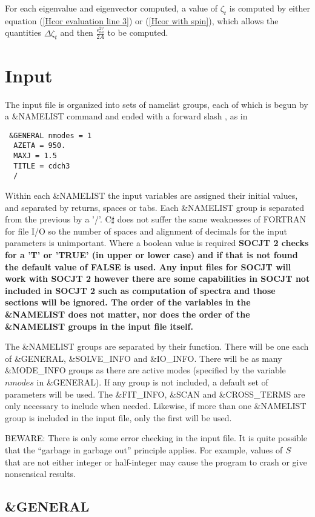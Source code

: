 \documentclass{article}
\newcommand{\socjttwo}{\bf{SOCJT 2 }}
\newcommand{\socjt}{{\bf SOCJT }}
\begin{document}
For each eigenvalue and eigenvector computed, a value of $\zeta _t$ is
computed by either equation (\ref{Hcor evaluation line 3}) or 
(\ref{Hcor with spin}), which allows the quantities $\Delta \zeta _t $
and then $\frac{\epsilon _{aa}^{2v}}{2A}$ to be computed.

\section{Input} \label{section:input}

The input file is organized into sets of namelist groups, each of
which is begun by a \&NAMELIST command and ended with a forward slash
\/, as in 
\begin{verbatim}
 &GENERAL nmodes = 1
  AZETA = 950.
  MAXJ = 1.5
  TITLE = cdch3 
  /
\end{verbatim}
Within each \&NAMELIST the input variables are assigned their initial
values, and separated by returns, spaces or tabs. Each \&NAMELIST group is separated from
the previous by a '/'. C$\sharp$ does not suffer the same weaknesses of FORTRAN for file I/O
so the number of spaces and alignment of decimals for the input parameters is unimportant.
Where a boolean value is required \socjttwo checks for a 'T' or 'TRUE' (in upper or lower case)
and if that is not found the default value of FALSE is used. Any input files for \socjt will work
with \socjttwo however there are some capabilities in \socjt not included in \socjttwo such as 
computation of spectra and those sections will be ignored. The order of the variables in
the \&NAMELIST does not matter, nor does the order of the \&NAMELIST
groups in the input file itself.

The \&NAMELIST groups are separated by their function. There will be one each of
\&GENERAL, \&SOLVE\_INFO and \&IO\_INFO. There will be as many \&MODE\_INFO groups as there are active modes
(specified by the variable $nmodes$ in \&GENERAL). If any group is not included,
a default set of parameters will be used. The \&FIT\_INFO, \&SCAN and \&CROSS\_TERMS 
are only necessary to include when needed. Likewise, if more than one
\&NAMELIST group is included in the input file, only the first will be
used. 

BEWARE: There is only some error checking in the input file. It is
quite possible that the ``garbage in garbage out'' principle
applies. For example, values of ${\bf S}$ that are not either integer
or half-integer may cause the program to crash or give nonsensical
results.

\subsection{\&GENERAL}
\end{document}
